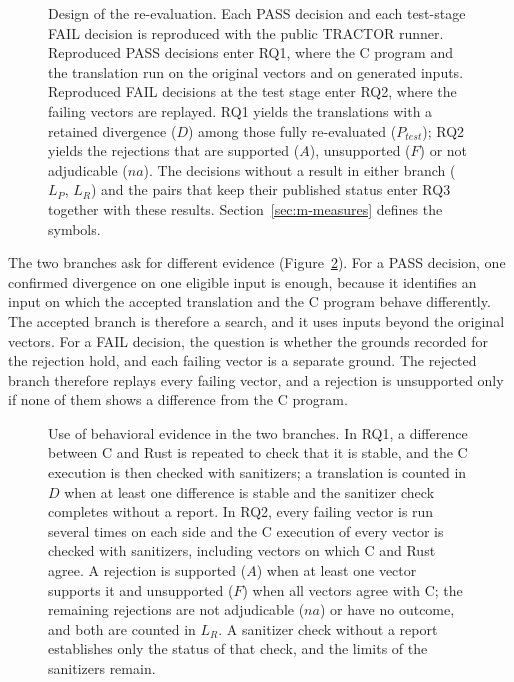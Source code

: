 \begin{figure}[!htb]
\centering
\resizebox{\linewidth}{!}{}
\caption{Design of the re-evaluation. Each PASS decision and each test-stage FAIL decision is reproduced with the public TRACTOR runner. Reproduced PASS decisions enter RQ1, where the C program and the translation run on the original vectors and on generated inputs. Reproduced FAIL decisions at the test stage enter RQ2, where the failing vectors are replayed. RQ1 yields the translations with a retained divergence ($D$) among those fully re-evaluated ($P_{\mathit{test}}$); RQ2 yields the rejections that are supported ($A$), unsupported ($F$) or not adjudicable ($\mathit{na}$). The decisions without a result in either branch ($L_P$, $L_R$) and the pairs that keep their published status enter RQ3 together with these results. Section~\ref{sec:m-measures} defines the symbols.}
\label{fig:m-design}
\end{figure}

The two branches ask for different evidence (Figure~\ref{fig:m-evidence}). For a PASS decision, one confirmed divergence on one eligible input is enough, because it identifies an input on which the accepted translation and the C program behave differently. The accepted branch is therefore a search, and it uses inputs beyond the original vectors. For a FAIL decision, the question is whether the grounds recorded for the rejection hold, and each failing vector is a separate ground. The rejected branch therefore replays every failing vector, and a rejection is unsupported only if none of them shows a difference from the C program.

\begin{figure}[!htb]
\centering
\resizebox{\linewidth}{!}{}
\caption{Use of behavioral evidence in the two branches. In RQ1, a difference between C and Rust is repeated to check that it is stable, and the C execution is then checked with sanitizers; a translation is counted in $D$ when at least one difference is stable and the sanitizer check completes without a report. In RQ2, every failing vector is run several times on each side and the C execution of every vector is checked with sanitizers, including vectors on which C and Rust agree. A rejection is supported ($A$) when at least one vector supports it and unsupported ($F$) when all vectors agree with C; the remaining rejections are not adjudicable ($\mathit{na}$) or have no outcome, and both are counted in $L_R$. A sanitizer check without a report establishes only the status of that check, and the limits of the sanitizers remain.}
\label{fig:m-evidence}
\end{figure}

